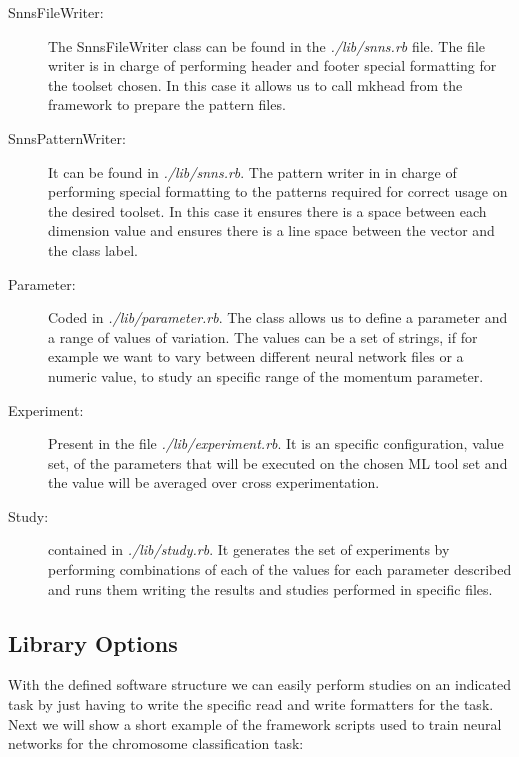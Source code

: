 \documentclass[a4paper,10pt,titlepage]{article}
\begin{document}
\begin{description}
\begin{itemize}
	\end{itemize}
	\item[SnnsFileWriter:] The SnnsFileWriter class can be found in the \textit{./lib/snns.rb} file. The file writer is in charge of performing header and footer special formatting for the toolset chosen. In this case it allows us to call mkhead from the framework to prepare the pattern files. 
	\item[SnnsPatternWriter:] It can be found in \textit{./lib/snns.rb}. The pattern writer in in charge of performing special formatting to the patterns required for correct usage on the desired toolset. In this case it ensures there is a space between each dimension value and ensures there is a line space between the vector and the class label. 
	\item[Parameter:] Coded in \textit{./lib/parameter.rb}. The class allows us to define a parameter and a range of values of variation. The values can be a set of strings, if for example we want to vary between different neural network files or a numeric value, to study an specific range of the momentum parameter. 
	\item[Experiment:] Present in the file \textit{./lib/experiment.rb}. It is an specific configuration, value set, of the parameters that will be executed on the chosen ML tool set and the value will be averaged over cross experimentation. 
	\item[Study:] contained in \textit{./lib/study.rb}. It generates the set of experiments by performing combinations of each of the values for each parameter described and runs them writing the results and studies performed in specific files. 
\end{description}
\subsection{Library Options}

\par With the defined software structure we can easily perform studies on an indicated task by just having to write the specific
read and write formatters for the task. Next we will show a short example of the framework scripts used to train neural networks 
for the chromosome classification task: 

\lstset{basicstyle=\footnotesize,language=Ruby}
\lstset{linewidth=500pt}
\lstset{numbers=left, stepnumber=1}
\lstset{frame=trBL,frameround=tttt}

\end{document}
